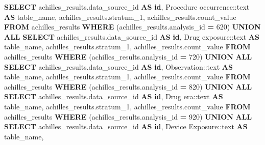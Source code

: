 \documentclass[
]{book}
\newenvironment{Shaded}{\begin{snugshade}}{\end{snugshade}}
\newcommand{\CharTok}[1]{\textcolor[rgb]{0.31,0.60,0.02}{#1}}
\newcommand{\DecValTok}[1]{\textcolor[rgb]{0.00,0.00,0.81}{#1}}
\newcommand{\KeywordTok}[1]{\textcolor[rgb]{0.13,0.29,0.53}{\textbf{#1}}}
\newcommand{\NormalTok}[1]{#1}
\newcommand{\OperatorTok}[1]{\textcolor[rgb]{0.81,0.36,0.00}{\textbf{#1}}}
\newcommand{\StringTok}[1]{\textcolor[rgb]{0.31,0.60,0.02}{#1}}
\begin{document}
\begin{Shaded}
\begin{Highlighting}[]
        \KeywordTok{SELECT}\NormalTok{ achilles\_results.data\_source\_id }\KeywordTok{AS} \KeywordTok{id}\NormalTok{,}
           \StringTok{\textquotesingle{}Procedure occurrence\textquotesingle{}}\NormalTok{:}\CharTok{:text} \KeywordTok{AS}\NormalTok{ table\_name,}
\NormalTok{           achilles\_results.stratum\_1,}
\NormalTok{           achilles\_results.count\_value}
          \KeywordTok{FROM}\NormalTok{ achilles\_results}
         \KeywordTok{WHERE}\NormalTok{ (achilles\_results.analysis\_id }\OperatorTok{=} \DecValTok{620}\NormalTok{)}
       \KeywordTok{UNION} \KeywordTok{ALL}
        \KeywordTok{SELECT}\NormalTok{ achilles\_results.data\_source\_id }\KeywordTok{AS} \KeywordTok{id}\NormalTok{,}
           \StringTok{\textquotesingle{}Drug exposure\textquotesingle{}}\NormalTok{:}\CharTok{:text} \KeywordTok{AS}\NormalTok{ table\_name,}
\NormalTok{           achilles\_results.stratum\_1,}
\NormalTok{           achilles\_results.count\_value}
          \KeywordTok{FROM}\NormalTok{ achilles\_results}
         \KeywordTok{WHERE}\NormalTok{ (achilles\_results.analysis\_id }\OperatorTok{=} \DecValTok{720}\NormalTok{)}
       \KeywordTok{UNION} \KeywordTok{ALL}
        \KeywordTok{SELECT}\NormalTok{ achilles\_results.data\_source\_id }\KeywordTok{AS} \KeywordTok{id}\NormalTok{,}
           \StringTok{\textquotesingle{}Observation\textquotesingle{}}\NormalTok{:}\CharTok{:text} \KeywordTok{AS}\NormalTok{ table\_name,}
\NormalTok{           achilles\_results.stratum\_1,}
\NormalTok{           achilles\_results.count\_value}
          \KeywordTok{FROM}\NormalTok{ achilles\_results}
         \KeywordTok{WHERE}\NormalTok{ (achilles\_results.analysis\_id }\OperatorTok{=} \DecValTok{820}\NormalTok{)}
       \KeywordTok{UNION} \KeywordTok{ALL}
        \KeywordTok{SELECT}\NormalTok{ achilles\_results.data\_source\_id }\KeywordTok{AS} \KeywordTok{id}\NormalTok{,}
           \StringTok{\textquotesingle{}Drug era\textquotesingle{}}\NormalTok{:}\CharTok{:text} \KeywordTok{AS}\NormalTok{ table\_name,}
\NormalTok{           achilles\_results.stratum\_1,}
\NormalTok{           achilles\_results.count\_value}
          \KeywordTok{FROM}\NormalTok{ achilles\_results}
         \KeywordTok{WHERE}\NormalTok{ (achilles\_results.analysis\_id }\OperatorTok{=} \DecValTok{920}\NormalTok{)}
       \KeywordTok{UNION} \KeywordTok{ALL}
        \KeywordTok{SELECT}\NormalTok{ achilles\_results.data\_source\_id }\KeywordTok{AS} \KeywordTok{id}\NormalTok{,}
           \StringTok{\textquotesingle{}Device Exposure\textquotesingle{}}\NormalTok{:}\CharTok{:text} \KeywordTok{AS}\NormalTok{ table\_name,}

\end{Highlighting}
\end{Shaded}
\end{document}
